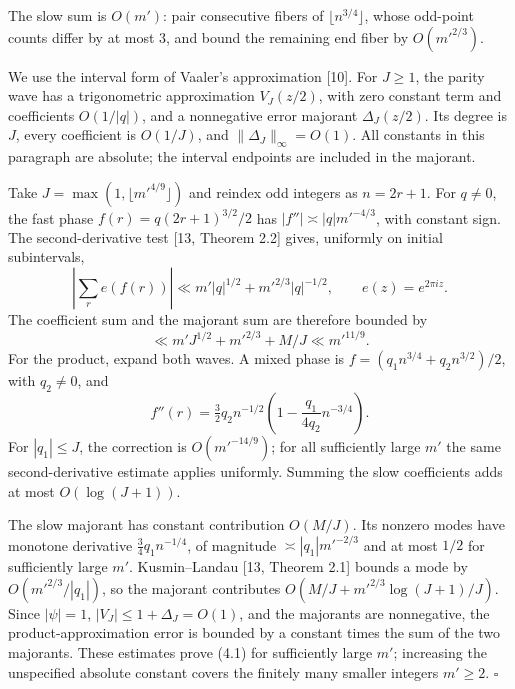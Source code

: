 \documentclass[11pt,a4paper]{article}
\begin{document}
The slow sum is \(O(m')\): pair consecutive fibers of
\(\lfloor n^{3/4}\rfloor\), whose odd-point counts differ by at most
\(3\), and bound the remaining end fiber by \(O(m'^{2/3})\).

We use the interval form of Vaaler's approximation {[}10{]}. For
\(J\ge1\), the parity wave has a trigonometric approximation
\(V_J(z/2)\), with zero constant term and coefficients \(O(1/|q|)\), and
a nonnegative error majorant \(\Delta_J(z/2)\). Its degree is \(J\),
every coefficient is \(O(1/J)\), and \(\|\Delta_J\|_\infty=O(1)\). All
constants in this paragraph are absolute; the interval endpoints are
included in the majorant.

Take \(J=\max(1,\lfloor m'^{4/9}\rfloor)\) and reindex odd integers as
\(n=2r+1\). For \(q\ne0\), the fast phase \(f(r)=q(2r+1)^{3/2}/2\) has
\(|f''|\asymp |q|m'^{-4/3}\), with constant sign. The second-derivative
test {[}13, Theorem 2.2{]} gives, uniformly on initial subintervals, \[
\left|\sum_r e(f(r))\right|
 \ll m'|q|^{1/2}+m'^{2/3}|q|^{-1/2},\qquad e(z)=e^{2\pi iz}.
\] The coefficient sum and the majorant sum are therefore bounded by \[
\ll m'J^{1/2}+m'^{2/3}+M/J\ll m'^{11/9}.
\] For the product, expand both waves. A mixed phase is
\(f=(q_1n^{3/4}+q_2n^{3/2})/2\), with \(q_2\ne0\), and \[
f''(r)=\tfrac32q_2n^{-1/2}
 \left(1-\frac{q_1}{4q_2}n^{-3/4}\right).
\] For \(|q_1|\le J\), the correction is \(O(m'^{-14/9})\); for all
sufficiently large \(m'\) the same second-derivative estimate applies
uniformly. Summing the slow coefficients adds at most \(O(\log(J+1))\).

The slow majorant has constant contribution \(O(M/J)\). Its nonzero
modes have monotone derivative \(\tfrac34 q_1 n^{-1/4}\), of magnitude
\(\asymp |q_1|m'^{-2/3}\) and at most \(1/2\) for sufficiently large
\(m'\). Kusmin--Landau {[}13, Theorem 2.1{]} bounds a mode by
\(O(m'^{2/3}/|q_1|)\), so the majorant contributes
\(O(M/J+m'^{2/3}\log(J+1)/J)\). Since \(|\psi|=1\),
\(|V_J|\le1+\Delta_J=O(1)\), and the majorants are nonnegative, the
product-approximation error is bounded by a constant times the sum of
the two majorants. These estimates prove (4.1) for sufficiently large
\(m'\); increasing the unspecified absolute constant covers the finitely
many smaller integers \(m'\ge2\). \(\square\)
\end{document}
